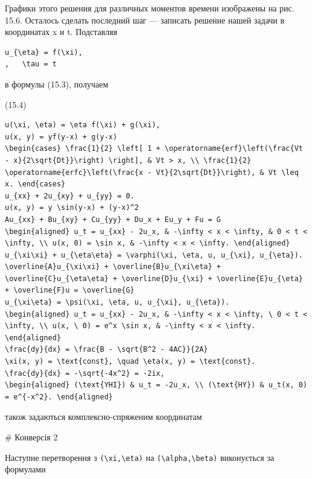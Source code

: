 \documentclass[
  ukrainian,
]{article}
\begin{document}
Графики этого решения для различных моментов времени изображены на рис.
15.6. Осталось сделать последний шаг --- записать решение нашей задачи в
координатах x и t. Подставляя

\begin{verbatim}
u_{\eta} = f(\xi),
,   \tau = t
\end{verbatim}

в формулы (15.3), получаем

(15.4)

\begin{verbatim}
u(\xi, \eta) = \eta f(\xi) + g(\xi),
u(x, y) = yf(y-x) + g(y-x)
\begin{cases} \frac{1}{2} \left[ 1 + \operatorname{erf}\left(\frac{Vt - x}{2\sqrt{Dt}}\right) \right], & Vt > x, \\ \frac{1}{2} \operatorname{erfc}\left(\frac{x - Vt}{2\sqrt{Dt}}\right), & Vt \leq x. \end{cases}
u_{xx} + 2u_{xy} + u_{yy} = 0.
u(x, y) = y \sin(y-x) + (y-x)^2
Au_{xx} + Bu_{xy} + Cu_{yy} + Du_x + Eu_y + Fu = G
\begin{aligned} u_t = u_{xx} - 2u_x, & -\infty < x < \infty, & 0 < t < \infty, \\ u(x, 0) = \sin x, & -\infty < x < \infty. \end{aligned}
u_{\xi\xi} + u_{\eta\eta} = \varphi(\xi, \eta, u, u_{\xi}, u_{\eta}).
\overline{A}u_{\xi\xi} + \overline{B}u_{\xi\eta} + \overline{C}u_{\eta\eta} + \overline{D}u_{\xi} + \overline{E}u_{\eta} + \overline{F}u = \overline{G}
u_{\xi\eta} = \psi(\xi, \eta, u, u_{\xi}, u_{\eta}).
\begin{aligned} u_t = u_{xx} - 2u_x, & -\infty < x < \infty, \ 0 < t < \infty, \\ u(x, \ 0) = e^x \sin x, & -\infty < x < \infty. \end{aligned}
\frac{dy}{dx} = \frac{B - \sqrt{B^2 - 4AC}}{2A}
\xi(x, y) = \text{const}, \quad \eta(x, y) = \text{const}.
\frac{dy}{dx} = -\sqrt{-4x^2} = -2ix,
\begin{aligned} (\text{YHI}) & u_t = -2u_x, \\ (\text{HY}) & u_t(x, 0) = e^{-x^2}. \end{aligned}
\end{verbatim}

також задаються комплексно-спряженим координатам

\# Конверсія 2

Наступне перетворення з
\texttt{(\textbackslash{}xi,\textbackslash{}eta)} на
\texttt{(\textbackslash{}alpha,\textbackslash{}beta)} виконується за
формулами
\end{document}
